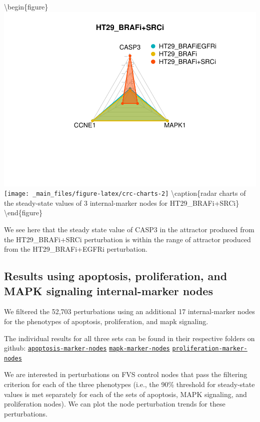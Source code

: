 \documentclass[
]{book}
\begin{document}
\textbackslash begin\{figure\}
\includegraphics[width=0.5\linewidth]{_main_files/figure-latex/crc-charts-1} \texttt{[image: \_main\_files/figure-latex/crc-charts-2]} \textbackslash caption\{radar charts of the steady-state values of 3 internal-marker nodes for HT29\_BRAFi+SRCi\}\label{fig:crc-charts}
\textbackslash end\{figure\}

We see here that the steady state value of CASP3 in the attractor produced from the HT29\_BRAFi+SRCi perturbation is within the range of attractor produced from the HT29\_BRAFi+EGFRi perturbation.

\hypertarget{results-using-apoptosis-proliferation-and-mapk-signaling-internal-marker-nodes}{%
\subsection{Results using apoptosis, proliferation, and MAPK signaling internal-marker nodes}\label{results-using-apoptosis-proliferation-and-mapk-signaling-internal-marker-nodes}}

We filtered the 52,703 perturbations using an additional 17 internal-marker nodes for the phenotypes of apoptosis, proliferation, and mapk signaling.

The individual results for all three sets can be found in their respective folders on github:
\href{https://github.com/VeraLiconaResearchGroup/Netisce/tree/main/colorectal_cancer_validation/results/apoptosis-marker-nodes}{\texttt{apoptosis-marker-nodes}}
\href{https://github.com/VeraLiconaResearchGroup/Netisce/tree/main/colorectal_cancer_validation/results/mapk-marker-nodes}{\texttt{mapk-marker-nodes}}
\href{https://github.com/VeraLiconaResearchGroup/Netisce/tree/main/colorectal_cancer_validation/results/proliferation-marker-nodes}{\texttt{proliferation-marker-nodes}}

We are interested in perturbations on FVS control nodes that pass the filtering criterion for each of the three phenotypes (i.e., the 90\% threshold for steady-state values is met separately for each of the sets of apoptosis, MAPK signaling, and proliferation nodes). We can plot the node perturbation trends for these perturbations.
\end{document}
